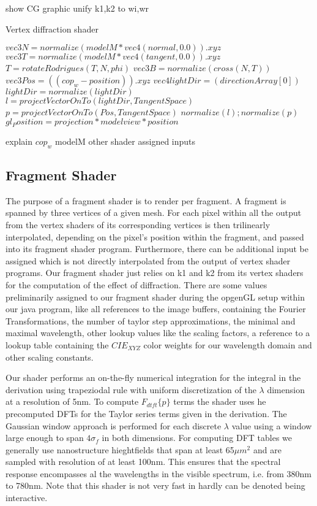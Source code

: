 show CG graphic
unify k1,k2 to wi,wr



\begin{algorithm}[H]
  \caption{Vertex diffraction shader}
  \begin{algorithmic}
      \State $ vec3 N = normalize(modelM * vec4(normal,0.0)).xyz$
      \State $ vec3 T = normalize(modelM * vec4(tangent,0.0)).xyz$
      \State $ T = rotateRodrigues(T, N, phi)$
      \State $ vec3 B = normalize(cross(N, T))$
      \State $ vec3 Pos = ((cop_w-position)).xyz$
      \State $ vec4 lightDir = (directionArray[0])$
      \State $ lightDir = normalize(lightDir)$
      \State $ l = projectVectorOnTo(lightDir, TangentSpace)$
      \State $ p = projectVectorOnTo(Pos, TangentSpace)$
      \State $normalize(l); normalize(p)$
      \State $gl_Position = projection * modelview * position$
    \EndFor
  \end{algorithmic}
\end{algorithm}

explain $cop_w$
modelM
other shader assigned inputs


\subsection{Fragment Shader}
The purpose of a fragment shader is to render per fragment. A fragment is spanned by three vertices of a given mesh. For each pixel within all the output from the vertex shaders of its corresponding vertices is then trilinearly interpolated, depending on the pixel's position within the fragment, and passed into its fragment shader program.
Furthermore, there can be additional input be assigned which is not directly interpolated from the output of vertex shader programs. Our fragment shader just relies on k1 and k2 from its vertex shaders for the computation of the effect of diffraction.
There are some values preliminarily assigned to our fragment shader during the opgenGL setup within our java program, like all references to the image buffers, containing the Fourier Transformations, the number of taylor step approximations, the minimal and maximal wavelength, other lookup values like the scaling factors, a reference to a lookup table containing the $CIE_{XYZ}$ color weights for our wavelength domain and other scaling constants.

Our shader performs an on-the-fly numerical integration for the integral in the derivation using trapeziodal rule with uniform discretization of the $\lambda$ dimension at a resolution of 5nm. To compute $F_{dtft}\{p\}$ terms the shader uses he precomputed DFTs for the Taylor series terms given in the derivation. The Gaussian window approach is performed for each discrete $\lambda$ value using a window large enough to span $4\sigma_f$ in both dimensions. For computing DFT tables we generally use nanostructure hieghtfields that span at least 65$\mu m^2$ and are sampled with resolution of at least 100nm. This ensures that the spectral response encompasses al the wavelengths in the visible spectrum, i.e. from 380nm to 780nm. Note that this shader is not very fast in hardly can be denoted being interactive. 

